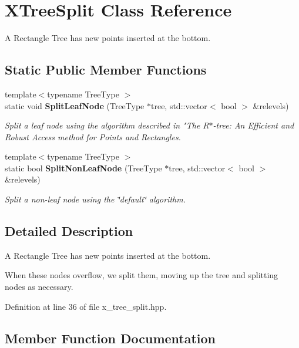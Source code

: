 \section{X\+Tree\+Split Class Reference}
\label{classmlpack_1_1tree_1_1XTreeSplit}


A Rectangle Tree has new points inserted at the bottom.  


\subsection*{Static Public Member Functions}
\begin{DoxyCompactItemize}
\item 
{\footnotesize template$<$typename Tree\+Type $>$ }\\static void \textbf{ Split\+Leaf\+Node} (Tree\+Type $\ast$tree, std\+::vector$<$ bool $>$ \&relevels)
\begin{DoxyCompactList}\small\item\em Split a leaf node using the algorithm described in "The R$\ast$-\/tree\+: An Efficient and Robust Access method for Points and Rectangles. \end{DoxyCompactList}\item 
{\footnotesize template$<$typename Tree\+Type $>$ }\\static bool \textbf{ Split\+Non\+Leaf\+Node} (Tree\+Type $\ast$tree, std\+::vector$<$ bool $>$ \&relevels)
\begin{DoxyCompactList}\small\item\em Split a non-\/leaf node using the \char`\"{}default\char`\"{} algorithm. \end{DoxyCompactList}\end{DoxyCompactItemize}


\subsection{Detailed Description}
A Rectangle Tree has new points inserted at the bottom. 

When these nodes overflow, we split them, moving up the tree and splitting nodes as necessary. 

Definition at line 36 of file x\+\_\+tree\+\_\+split.\+hpp.



\subsection{Member Function Documentation}
\mbox{\label{classmlpack_1_1tree_1_1XTreeSplit_af73652d9536a1715364bbb0e4a9ba04e}} 
